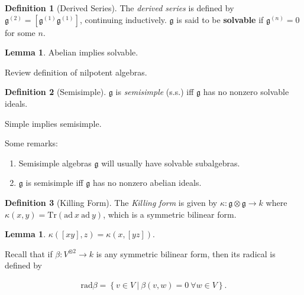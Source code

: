 \documentclass[11pt]{scrartcl}
\theoremstyle{definition}
\theoremstyle{theorem}
\newtheorem{lemma}[theorem]{Lemma}
\theoremstyle{proof}
\theoremstyle{definition}
\newtheorem{definition}{Definition}[theorem]
\theoremstyle{break}
\theoremstyle{problem}
\providecommand{\tightlist}{%
  \setlength{\itemsep}{0pt}\setlength{\parskip}{0pt}}
\newcommand{\ad}[0]{\mathrm{ad}~}
\newcommand{\lieg}[0]{{\mathfrak{g}}}
\newcommand{\suchthat}[0]{{~\mathrel{\Big|}~}}
\newcommand{\tensor}[0]{\otimes}
\newcommand{\theset}[1]{\left\{{#1}\right\}}
\newcommand{\tr}[0]{\mathrm{Tr}}
\renewcommand{\to}[0]{\longrightarrow}
\begin{document}
\begin{definition}[Derived Series]

The \emph{derived series} is defined by
\(\lieg^{(2)} = [\lieg^{(1)} \lieg^{(1)}]\), continuing inductively.
\(\lieg\) is said to be \textbf{solvable} if \(\lieg^{(n)} = 0\) for
some \(n\).\end{definition}

\begin{lemma}

Abelian implies solvable.\end{lemma}

Review definition of nilpotent algebras.

\begin{definition}[Semisimple]

\(\lieg\) is \emph{semisimple} (s.s.) iff \(\lieg\) has no nonzero
solvable ideals.\end{definition}

\begin{description}
\tightlist
\item[Exercise]
Simple implies semisimple.
\end{description}

Some remarks:

\begin{enumerate}
\def\labelenumi{\arabic{enumi}.}
\tightlist
\item
  Semisimple algebras \(\lieg\) will usually have solvable subalgebras.
\item
  \(\lieg\) is semisimple iff \(\lieg\) has no nonzero abelian ideals.
\end{enumerate}

\begin{definition}[Killing Form]

The \emph{Killing form} is given by
\(\kappa: \lieg \tensor \lieg \to k\) where
\(\kappa(x, y) = \tr(\ad x ~\ad y)\), which is a symmetric bilinear
form.\end{definition}

\begin{lemma}

\(\kappa([x y], z) = \kappa(x, [y z])\).\end{lemma}

Recall that if \(\beta: V^{\tensor 2} \to k\) is any symmetric bilinear
form, then its radical is defined by

\begin{align*}
\mathrm{rad} \beta = \theset{v\in V \suchthat \beta(v, w) = 0 ~\forall w\in V}
.\end{align*}
\end{document}
